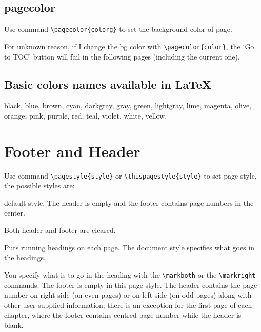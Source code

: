 \newpage
\subsection{pagecolor}
Use command \verb|\pagecolor{colorg}| to set the background color of page.

{\color{red} For unknown reason, if I change the bg color with 
\verb|\pagecolor{color}|, the `Go to TOC' button will fail in the 
following pages (including the current one).}
\newpage

\subsection{Basic colors names available in \LaTeX{}}
black, blue, brown, cyan, darkgray, gray, green, lightgray, lime, 
magenta, olive, orange, pink, purple, red, teal, violet, white, yellow.

\section{Footer and Header}
Use command \verb|\pagestyle{style}| or \verb|\thispagestyle{style}| 
to set page style, the possible styles are:
\begin{description}[style=nextline]
    \item [plain]   default style. The header is empty and the footer
	contains page numbers in the center.
    \item [empty]   Both header and footer are cleared.  
    \item [headings]	Puts running headings on each page. The document
	style specifies what goes in the headings.
    \item [myheadings]	You specify what is to go in the heading with the
	\verb|\markboth| or the \verb|\markright| commands. 
	The footer is empty in this page style. The header
	contains the page number on right side (on even pages) or on left
	side (on odd pages) along with other user-supplied information;
	there is an exception for the first page of each chapter, where the
	footer contains centred page number while the header is blank.
\end{description}

\thispagestyle{fancy}   %
\fancyhf{}  %
\renewcommand{\headrulewidth}{2pt}
\renewcommand{\footrulewidth}{1pt}
\rhead{\leftmark}   
\lhead{\rightmark}  
\chead{\thepage}
\rfoot{\thepage}

